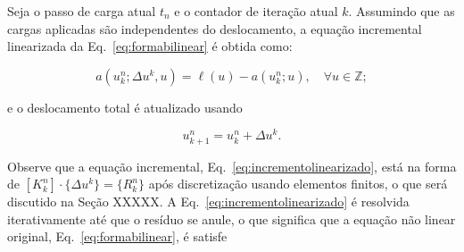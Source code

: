 Seja o passo de carga atual $t_n$ e o contador de iteração atual $k$. Assumindo que as cargas aplicadas são independentes do deslocamento, a equação incremental linearizada da Eq.~\eqref{eq:formabilinear} é obtida como:

\begin{equation}\label{eq:incrementolinearizado}
	a \left( u^n_k; \Delta u^k, u \right) = \ell \left( u \right) - a \left( u^n_k; u \right), \quad \forall u \in \mathbb{Z}; 
\end{equation}

e o deslocamento total é atualizado usando

\begin{equation}
	u^{n}_{k+1} = u^{n}_{k} + \Delta u^k. \tag{3.76}
\end{equation}

Observe que a equação incremental, Eq.~\eqref{eq:incrementolinearizado}, está na forma de $[K^n_k] \cdot \{ \Delta u^k \} = \{ R^n_k \}$ após discretização usando elementos finitos, o que será discutido na {\color{red}Seção XXXXX}. A Eq.~\eqref{eq:incrementolinearizado} é resolvida iterativamente até que o resíduo se anule, o que significa que a equação não linear original, Eq.~\eqref{eq:formabilinear}, é satisfe